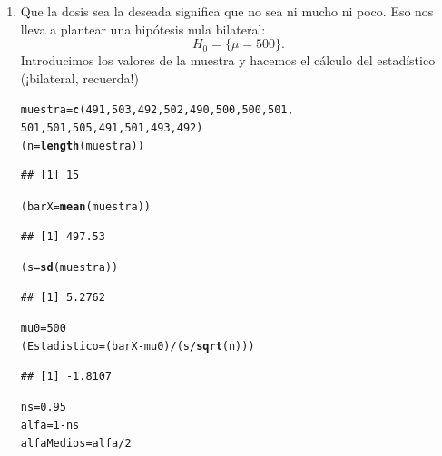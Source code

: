 \documentclass[10pt,a4paper]{article}\usepackage[]{graphicx}\usepackage[]{color}
\makeatletter
\newcommand{\hlnum}[1]{\textcolor[rgb]{0.686,0.059,0.569}{#1}}%
\newcommand{\hlopt}[1]{\textcolor[rgb]{0,0,0}{#1}}%
\newcommand{\hlstd}[1]{\textcolor[rgb]{0.345,0.345,0.345}{#1}}%
\newcommand{\hlkwb}[1]{\textcolor[rgb]{0.69,0.353,0.396}{#1}}%
\newcommand{\hlkwd}[1]{\textcolor[rgb]{0.737,0.353,0.396}{\textbf{#1}}}%
\newenvironment{kframe}{%
 \def\at@end@of@kframe{}%
 \ifinner\ifhmode%
  \def\at@end@of@kframe{\end{minipage}}%
  \begin{minipage}{\columnwidth}%
 \fi\fi%
 \def\FrameCommand##1{\hskip\@totalleftmargin \hskip-\fboxsep
 \colorbox{shadecolor}{##1}\hskip-\fboxsep
     \hskip-\linewidth \hskip-\@totalleftmargin \hskip\columnwidth}%
 \MakeFramed {\advance\hsize-\width
   \@totalleftmargin\z@ \linewidth\hsize
   \@setminipage}}%
 {\par\unskip\endMakeFramed%
 \at@end@of@kframe}
\newenvironment{knitrout}{}{} %
\makeatother
\begin{document}
\begin{enumerate}
  \item Que la dosis sea la deseada significa que no sea ni mucho ni poco. Eso nos lleva a plantear una hipótesis nula bilateral:
      \[H_0=\{\mu = 500\}.\]
      Introducimos los valores de la muestra y hacemos el cálculo del estadístico (¡bilateral, recuerda!)
\begin{knitrout}
\color{fgcolor}\begin{kframe}
\begin{alltt}
  \hlstd{muestra} \hlkwb{=} \hlkwd{c}\hlstd{(}\hlnum{491}\hlstd{,} \hlnum{503}\hlstd{,} \hlnum{492}\hlstd{,} \hlnum{502}\hlstd{,} \hlnum{490}\hlstd{,} \hlnum{500}\hlstd{,} \hlnum{500}\hlstd{,} \hlnum{501}\hlstd{,}
        \hlnum{501}\hlstd{,} \hlnum{501}\hlstd{,} \hlnum{505}\hlstd{,} \hlnum{491}\hlstd{,} \hlnum{501}\hlstd{,} \hlnum{493}\hlstd{,} \hlnum{492}\hlstd{)}
  \hlstd{(n} \hlkwb{=} \hlkwd{length}\hlstd{(muestra))}
\end{alltt}
\begin{verbatim}
## [1] 15
\end{verbatim}
\begin{alltt}
  \hlstd{(barX} \hlkwb{=} \hlkwd{mean}\hlstd{(muestra))}
\end{alltt}
\begin{verbatim}
## [1] 497.53
\end{verbatim}
\begin{alltt}
  \hlstd{(s} \hlkwb{=} \hlkwd{sd}\hlstd{(muestra))}
\end{alltt}
\begin{verbatim}
## [1] 5.2762
\end{verbatim}
\begin{alltt}
  \hlstd{mu0} \hlkwb{=} \hlnum{500}
  \hlstd{(Estadistico} \hlkwb{=} \hlstd{(barX} \hlopt{-} \hlstd{mu0)} \hlopt{/} \hlstd{(s}\hlopt{/}\hlkwd{sqrt}\hlstd{(n)))}
\end{alltt}
\begin{verbatim}
## [1] -1.8107
\end{verbatim}
\begin{alltt}
  \hlstd{ns} \hlkwb{=} \hlnum{0.95}
  \hlstd{alfa} \hlkwb{=} \hlnum{1} \hlopt{-} \hlstd{ns}
  \hlstd{alfaMedios} \hlkwb{=} \hlstd{alfa} \hlopt{/} \hlnum{2}
\end{alltt}
\end{kframe}
\end{knitrout}


\end{enumerate}
\end{document}
